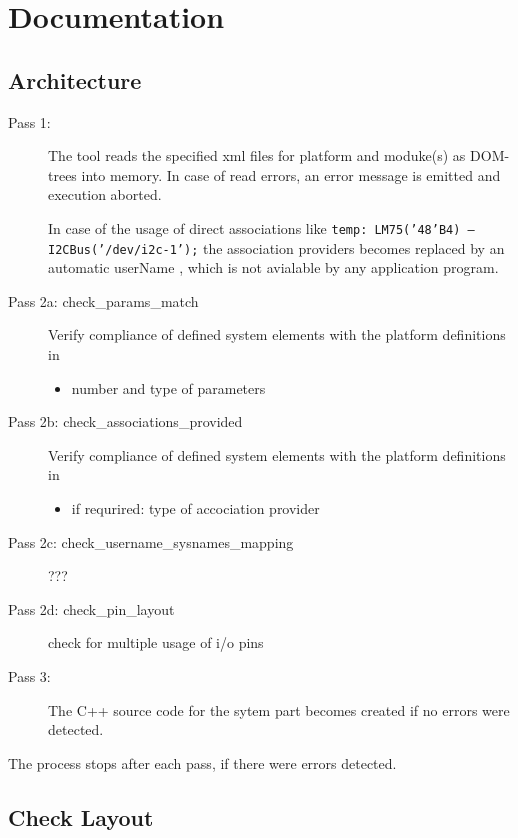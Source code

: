 \chapter{Documentation}

\section{Architecture}

\begin{description}
\item[Pass 1:]
The tool reads the specified xml files for platform and moduke(s)
 as DOM-trees into memory.
In case of read errors, an error message is emitted and execution aborted.

In case of the usage of direct associations like
\texttt{temp: LM75('48'B4) --- I2CBus('/dev/i2c-1');}
the association providers becomes  replaced by an automatic userName , which
is not avialable by any application program.


\item [Pass 2a: check\_params\_match]
Verify compliance of defined system elements with the platform definitions in
\begin{itemize}
  \item number and type of parameters
\end{itemize}

\item [Pass 2b: check\_associations\_provided]
Verify compliance of defined system elements with the platform definitions in
\begin{itemize}
  \item if requrired: type of accociation provider
\end{itemize}

\item [Pass 2c: check\_username\_sysnames\_mapping] ???

\item [Pass 2d: check\_pin\_layout] check for multiple usage of i/o pins

\item[Pass 3:]
The C++ source code for the sytem part becomes created if no errors were detected.

\end{description}

The process stops after each pass, if there were errors detected.

\section{Check Layout}

